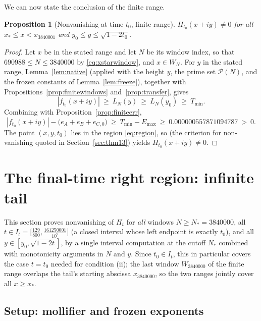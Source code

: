 \documentclass[11pt]{article}
\newtheorem{proposition}[theorem]{Proposition}
\theoremstyle{definition}
\newcommand{\calP}{\mathcal{P}}
\begin{document}
We can now state the conclusion of the finite range.

\begin{proposition}[Nonvanishing at time $t_0$, finite range]
\label{prop:finitelane}
$H_{t_0}(x+iy)\neq0$ for all $x_*\le x<x_{3840001}$ and
$y_0\le y\le\sqrt{1-2t_0}$.
\end{proposition}

\begin{proof}
Let $x$ be in the stated range and let $N$ be its window index, so
that $690988\le N\le3840000$ by \eqref{eq:xstarwindow}, and
$x\in W_N$. For $y$ in the stated range, Lemma~\ref{lem:native}
(applied with the height $y$, the prime set $\calP(N)$, and the
frozen constants of Lemma~\ref{lem:freeze}), together with
Propositions~\ref{prop:finitewindows} and~\ref{prop:transfer}, gives
\[
|f_{t_0}(x+iy)|\ \ge\ L_N(y)\ \ge\ L_N(y_0)\ \ge\ T_{\min}.
\]
Combining with Proposition~\ref{prop:finiteerr},
\begin{equation}\label{eq:finitemargin}
|f_{t_0}(x+iy)|-\bigl(e_A+e_B+e_{C,0}\bigr)
\ \ge\ T_{\min}-E_{\max}
\ \ge\ 0.000000557871094787\ >\ 0 .
\end{equation}
The point $(x,y,t_0)$ lies in the region \eqref{eq:region}, so
\cite[Corollary~1.4]{Polymath} (the criterion for non-vanishing
quoted in Section~\ref{sec:thm13}) yields
$H_{t_0}(x+iy)\neq0$.
\end{proof}

\section{The final-time right region: infinite tail}\label{sec:tail}

This section proves nonvanishing of $H_t$ for \emph{all} windows
$N\ge N_*=3840000$, all
$t\in I_t=\bigl[\frac{129}{800},\frac{161250001}{10^9}\bigr]$ (a
closed interval whose left endpoint is exactly $t_0$), and all
$y\in[y_0,\sqrt{1-2t}]$, by a single interval computation at the
cutoff $N_*$ combined with monotonicity arguments in $N$ and $y$.
Since $t_0\in I_t$, this in particular covers the case $t=t_0$
needed for condition (ii); the last window $W_{3840000}$ of the
finite range overlaps the tail's starting abscissa $x_{3840000}$, so
the two ranges jointly cover all $x\ge x_*$.

\subsection{Setup: mollifier and frozen exponents}
\end{document}
